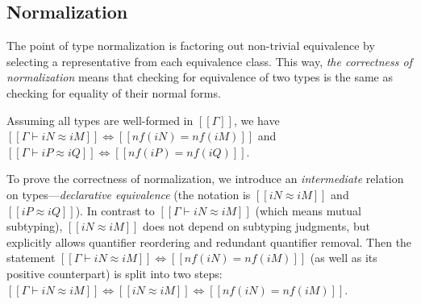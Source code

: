 \subsection{Normalization}
    The point of type normalization is factoring out non-trivial equivalence 
    by selecting a representative from each equivalence class.
    This way, \emph{the correctness of normalization} means that
    checking for equivalence of two types is the same as checking for equality of their normal forms.
    \begin{lemma*}
        Assuming all types are well-formed in $[[Γ]]$, we have
            $[[Γ ⊢ iN ≈ iM]] \iff [[nf(iN) = nf(iM)]]$ and 
            $[[Γ ⊢ iP ≈ iQ]] \iff [[nf(iP) = nf(iQ)]]$.
    \end{lemma*}
    To prove the correctness of normalization, 
    we introduce an \emph{intermediate} relation on types---\emph{declarative equivalence}
    (the notation is $[[iN ≈ iM]]$ and $[[iP ≈ iQ]]$).
    In contrast to $[[Γ ⊢ iN ≈ iM]]$ (which means mutual subtyping), $[[iN ≈ iM]]$ does not depend on subtyping judgments, 
    but explicitly allows quantifier reordering and redundant quantifier removal.
    Then the statement $[[Γ ⊢ iN ≈ iM]] \iff [[nf(iN) = nf(iM)]]$ (as well as its positive counterpart) 
    is split into two steps: $[[Γ ⊢ iN ≈ iM]] \iff [[iN ≈ iM]] \iff [[nf(iN) = nf(iM)]]$.





